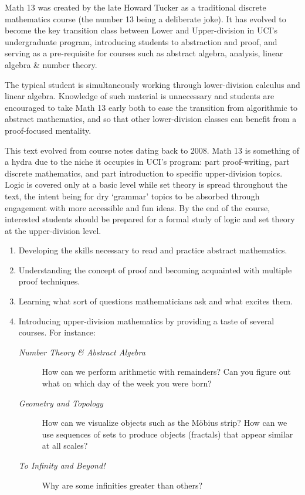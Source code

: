 Math 13 was created by the late Howard Tucker as a traditional discrete mathematics course (the number 13 being a deliberate joke). It has evolved to become the key transition class between Lower and Upper-division in UCI's undergraduate program, introducing students to abstraction and proof, and serving as a pre-requisite for courses such as abstract algebra, analysis, linear algebra \& number theory.\smallbreak

The typical student is simultaneously working through lower-division calculus and linear algebra. Knowledge of such material is unnecessary and students are encouraged to take Math 13 early both to ease the transition from algorithmic to abstract mathematics, and so that other lower-division classes can benefit from a proof-focused mentality.\smallbreak

This text evolved from course notes dating back to 2008. Math 13 is something of a hydra due to the niche it occupies in UCI's program: part proof-writing, part discrete mathematics, and part introduction to specific upper-division topics. Logic is covered only at a basic level while set theory is spread throughout the text, the intent being for dry `grammar' topics to be absorbed through engagement with more accessible and fun ideas. By the end of the course, interested students should be prepared for a formal study of logic and set theory at the upper-division level.



\begin{enumerate}
	\item Developing the skills necessary to read and practice abstract mathematics.
	\item Understanding the concept of proof and becoming acquainted with multiple proof techniques.
	\item Learning what sort of questions mathematicians ask and what excites them.
	\item Introducing upper-division mathematics by providing a taste of several courses. For instance:
	\begin{description}
		\item[\normalfont\emph{Number Theory \& Abstract Algebra}] How can we perform arithmetic with remainders? Can you figure out what on which day of the week you were born? 
		\item[\normalfont\emph{Geometry and Topology}] How can we visualize objects such as the Möbius strip? How can we use sequences of sets to produce objects (fractals) that appear similar at all scales?
		\item[\normalfont\emph{To Infinity and Beyond!}] Why are some infinities greater than others?
	\end{description}
\end{enumerate}


